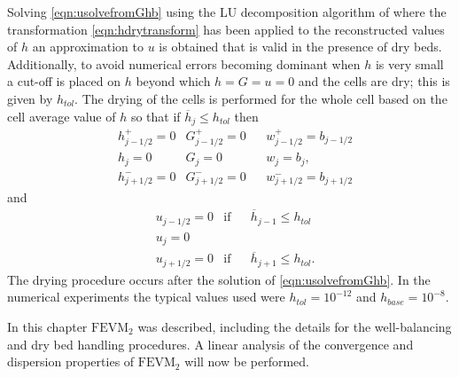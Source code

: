 Solving \eqref{eqn:usolvefromGhb} using the LU decomposition algorithm of \citet{NumRecC-1996} where the transformation \eqref{eqn:hdrytransform} has been applied to the reconstructed values of $h$ an approximation to $u$ is obtained that is valid in the presence of dry beds. Additionally, to avoid numerical errors becoming dominant when $h$ is very small a cut-off is placed on $h$ beyond which $h=G= u = 0$ and the cells are dry; this is given by $h_{tol}$. The drying of the cells is performed for the whole cell based on the cell average value of $h$ so that if $\overline{h}_j \le h_{tol}$ then
\begin{align*}
 & 	h^+_{j-1/2}  = 0   & 	G^+_{j-1/2}  = 0  & & 	w^+_{j-1/2}  = b_{j-1/2}   \\
 &	h_{j} = 0 & 	G_{j}  = 0  & 	&w_{j}  = b_{j},\\
 & 	h^-_{j+1/2}  = 0  & 	G^-_{j+1/2}  = 0 & 	&w^-_{j+1/2}  = b_{j+1/2} 
 \end{align*}
 and
 \begin{align*}
 & 	u_{j-1/2}  = 0  &\text{if}& &\overline{h}_{j-1}\le h_{tol} \\
 & 	u_{j}  = 0 \\
 & 	u_{j+1/2}  = 0  &\text{if}& &\overline{h}_{j+1} \le h_{tol}.
\end{align*}
The drying procedure occurs after the solution of \eqref{eqn:usolvefromGhb}. In the numerical experiments the typical values used were $h_{tol} = 10^{-12}$ and $h_{base} = 10^{-8}$.

\medskip

In this chapter $\text{FEVM}_2$ was described, including the details for the well-balancing and dry bed handling procedures. A linear analysis of the convergence and dispersion properties of $\text{FEVM}_2$ will now be performed. 
